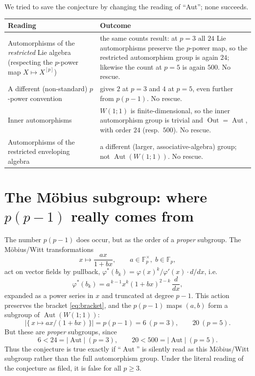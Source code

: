 \documentclass[11pt]{article}
\theoremstyle{definition}
\theoremstyle{remark}
\newcommand{\Aut}{\operatorname{Aut}}
\begin{document}
We tried to save the conjecture by changing the reading of ``Aut''; none
succeeds.

\begin{center}
\begin{tabular}{p{} p{}}
\toprule
Reading & Outcome \\
\midrule
Automorphisms of the \emph{restricted} Lie algebra (respecting the $p$-power
map $X\mapsto X^{[p]}$) & the same counts result: at $p=3$ all $24$ Lie
automorphisms preserve the $p$-power map, so the restricted automorphism group
is again $24$; likewise the count at $p=5$ is again $500$. No rescue. \\
A different (non-standard) $p$-power convention & gives $2$ at $p=3$ and $4$
at $p=5$, even further from $p(p-1)$. No rescue. \\
Inner automorphisms & $W(1;1)$ is finite-dimensional, so the inner
automorphism group is trivial and $\operatorname{Out}=\Aut$, with order $24$
(resp.\ $500$). No rescue. \\
Automorphisms of the restricted enveloping algebra & a different (larger,
associative-algebra) group; not $\Aut(W(1;1))$. No rescue. \\
\bottomrule
\end{tabular}
\end{center}

\section{The Möbius subgroup: where $p(p-1)$ really comes from}

The number $p(p-1)$ does occur, but as the order of a \emph{proper} subgroup.
The Möbius/Witt transformations
\[
x \longmapsto \frac{a x}{1+b x}, \qquad a\in \mathbb{F}_p^{\times},\;
b\in \mathbb{F}_p ,
\]
act on vector fields by pullback, $\varphi^*(b_k) = \varphi(x)^k/\varphi'(x)
\cdot d/dx$, i.e.
\[
\varphi^*(b_k) = a^{\,k-1} x^k (1+b x)^{2-k}\,\frac{d}{dx},
\]
expanded as a power series in $x$ and truncated at degree $p-1$. This action
preserves the bracket \eqref{eq:bracket}, and the $p(p-1)$ maps $(a,b)$ form a
subgroup of $\Aut(W(1;1))$:
\[
|\{\,x\mapsto a x/(1+b x)\,\}| = p(p-1) = 6 \ (p=3), \qquad 20 \ (p=5).
\]
But these are \emph{proper} subgroups, since
\[
6 < 24 = |\Aut| \ (p=3), \qquad 20 < 500 = |\Aut| \ (p=5).
\]
Thus the conjecture is true exactly if ``$\Aut$'' is silently read as this
Möbius/Witt subgroup rather than the full automorphism group. Under the
literal reading of the conjecture as filed, it is false for all $p\ge 3$.
\end{document}
